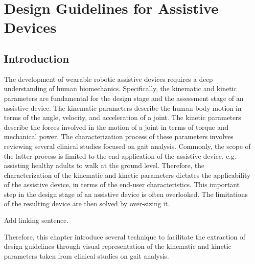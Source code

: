 \chapter{Design Guidelines for Assistive Devices} \label{sec:mimicHSMS}

\section{Introduction}

The development of wearable robotic assistive devices requires a deep understanding of human biomechanics. Specifically, the kinematic and kinetic parameters are fundamental for the design stage and the assessment stage of an assistive device. The kinematic parameters describe the human body motion in terms of the angle, velocity, and acceleration of a joint. The kinetic
parameters describe the forces involved in the motion of a joint in terms of torque and mechanical power. The characterization process of these parameters involves reviewing several clinical studies focused on gait analysis. Commonly, the scope of the latter process is limited to the end-application of the assistive device, e.g. assisting healthy adults to walk at the ground level. Therefore, the characterization of the kinematic and kinetic parameters dictates the applicability of the assistive device, in terms of the end-user characteristics. This important step in the design stage of an assistive device is often overlooked. The limitations of the resulting device are then solved by over-sizing it. 

Add linking sentence.

Therefore, this chapter introduce several technique to facilitate the extraction of design guidelines through visual representation of the kinematic and kinetic parameters taken from clinical studies on gait analysis.




